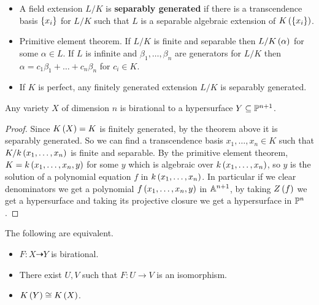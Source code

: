 \begin{definition}
\hfill
\begin{itemize}
\item A field extension $ L / K $ is \textbf{separably generated} if there is a transcendence basis $ \cb{x_i} $ for $ L / K $ such that $ L $ is a separable algebraic extension of $ K\rb{\cb{x_i}} $.
\item Primitive element theorem. If $ L / K $ is finite and separable then $ L / K\rb{\alpha} $ for some $ \alpha \in L $. If $ L $ is infinite and $ \beta_1, \dots, \beta_n $ are generators for $ L / K $ then $ \alpha = c_1\beta_1 + \dots + c_n\beta_n $ for $ c_i \in K $.
\item If $ K $ is perfect, any finitely generated extension $ L / K $ is separably generated.
\end{itemize}
\end{definition}

\begin{theorem}
Any variety $ X $ of dimension $ n $ is birational to a hypersurface $ Y \subseteq \P^{n + 1} $.
\end{theorem}

\begin{proof}
Since $ K\rb{X} = K $ is finitely generated, by the theorem above it is separably generated. So we can find a transcendence basis $ x_1, \dots, x_n \in K $ such that $ K / k\rb{x_1, \dots, x_n} $ is finite and separable. By the primitive element theorem, $ K = k\rb{x_1, \dots, x_n, y} $ for some $ y $ which is  algebraic over $ k\rb{x_1, \dots, x_n} $, so $ y $ is the solution of a polynomial equation $ f $ in $ k\rb{x_1, \dots, x_n} $. In particular if we clear denominators we get a polynomial $ f\rb{x_1, \dots, x_n, y} $ in $ \A^{n + 1} $, by taking $ Z\rb{f} $ we get a hypersurface and taking its projective closure we get a hypersurface in $ \P^n $.
\end{proof}


\begin{corollary}
The following are equivalent.
\begin{itemize}
\item $ F : X \dashrightarrow Y $ is birational.
\item There exist $ U, V $ such that $ F : U \to V $ is an isomorphism.
\item $ K\rb{Y} \cong K\rb{X} $.
\end{itemize}
\end{corollary}

